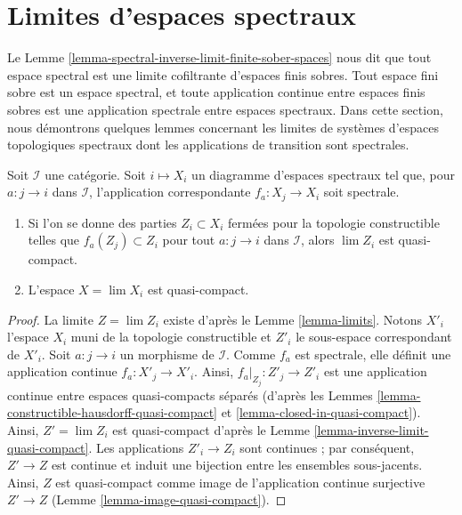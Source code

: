 \section{Limites d'espaces spectraux}
\label{section-limits-spectral}

\noindent
Le Lemme \ref{lemma-spectral-inverse-limit-finite-sober-spaces} nous dit
que tout espace spectral est une limite cofiltrante d'espaces finis
sobres. Tout espace fini sobre est un espace spectral, et toute application
continue entre espaces finis sobres est une application spectrale entre espaces
spectraux. Dans cette section, nous démontrons quelques lemmes concernant les
limites de systèmes d'espaces topologiques spectraux dont les applications de
transition sont spectrales.

\begin{lemma}
\label{lemma-inverse-limit-spectral-spaces-quasi-compact}
Soit $\mathcal{I}$ une catégorie. Soit $i \mapsto X_i$ un diagramme
d'espaces spectraux tel que, pour $a : j \to i$ dans $\mathcal{I}$,
l'application correspondante $f_a : X_j \to X_i$ soit spectrale.
\begin{enumerate}
\item Si l'on se donne des parties $Z_i \subset X_i$ fermées pour la topologie
constructible telles que $f_a(Z_j) \subset Z_i$ pour tout $a : j \to i$ dans
$\mathcal{I}$, alors $\lim Z_i$ est quasi-compact.
\item L'espace $X = \lim X_i$ est quasi-compact.
\end{enumerate}
\end{lemma}

\begin{proof}
La limite $Z = \lim Z_i$ existe d'après le Lemme \ref{lemma-limits}.
Notons $X'_i$ l'espace $X_i$ muni de la topologie constructible
et $Z'_i$ le sous-espace correspondant de $X'_i$.
Soit $a : j \to i$ un morphisme de $\mathcal{I}$. Comme $f_a$ est spectrale,
elle définit une application continue $f_a : X'_j \to X'_i$. Ainsi,
$f_a|_{Z_j} : Z'_j \to Z'_i$ est une application continue entre espaces
quasi-compacts séparés (d'après les
Lemmes \ref{lemma-constructible-hausdorff-quasi-compact} et
\ref{lemma-closed-in-quasi-compact}).
Ainsi, $Z' = \lim Z_i$ est quasi-compact d'après le
Lemme \ref{lemma-inverse-limit-quasi-compact}.
Les applications $Z'_i \to Z_i$ sont continues ; par conséquent,
$Z' \to Z$ est continue et induit une bijection entre les ensembles
sous-jacents. Ainsi,
$Z$ est quasi-compact comme image de l'application continue surjective
$Z' \to Z$ (Lemme \ref{lemma-image-quasi-compact}).
\end{proof}

